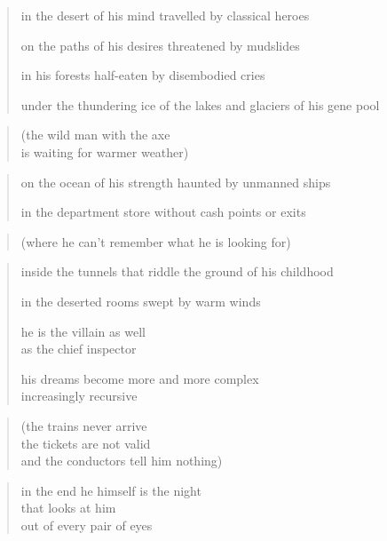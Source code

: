 {\setlength{\stanzaskip}{0.5em}


\begin{verse}
in the desert of his mind travelled by classical heroes

on the paths of his desires threatened by mudslides

in his forests half-eaten by disembodied cries

under the thundering ice of the lakes and glaciers of his gene pool
\end{verse}

\begin{quote}
(the wild man with the axe\\
is waiting for warmer weather)
\end{quote}

\begin{verse}
on the ocean of his strength haunted by unmanned ships

in the department store without cash points or exits
\end{verse}

\begin{quote}
(where he can't remember what he is looking for)
\end{quote}

\begin{verse}
inside the tunnels that riddle the ground of his childhood

in the deserted rooms swept by warm winds

he is the villain as well\\
as the chief inspector

his dreams become more and more complex\\
increasingly recursive
\end{verse}

\begin{quote}
(the trains never arrive\\
the tickets are not valid\\
and the conductors tell him nothing)
\end{quote}

\restoregeometry

\clearpage

\begin{verse}
in the end he himself is the night\\
that looks at him\\
out of every pair of eyes


\end{verse}}
